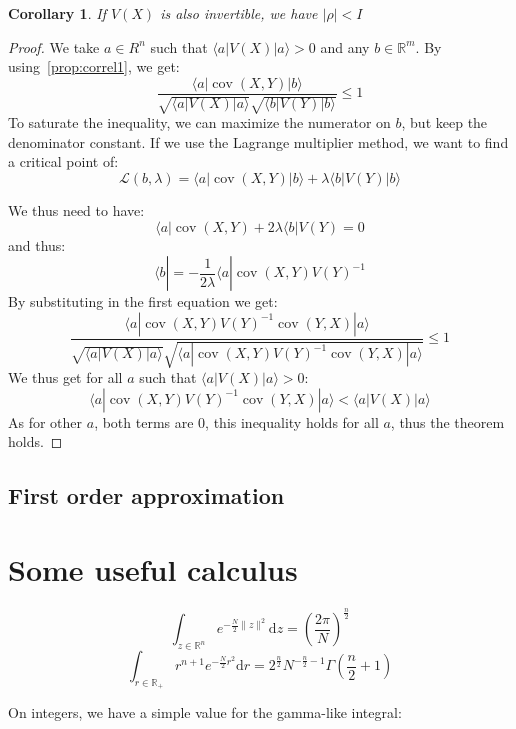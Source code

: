 \documentclass[10pt]{report}
\theoremstyle{plain}
\newtheorem{cor}{Corollary}[thm]
\theoremstyle{definition}
\theoremstyle{remark}
\newcommand{\R}{\ensuremath{\mathbb{R}}}
\newcommand{\ket}[1]{|#1\rangle}
\newcommand{\bra}[1]{\langle#1|}
\newcommand{\dd}{\mathrm{d}}
\renewcommand{\leq}{\leqslant}
\DeclareMathOperator{\cov}{cov}
\begin{document}
\begin{cor}
  If $V(X)$ is also invertible, we have $|\rho| < I$
\end{cor}

\begin{proof}
  We take $a \in R^n$ such that $\bra a V(X) \ket a > 0$ and any $b \in \R^m$.
  By using~\cref{prop:correl1}, we get:
  \[ \frac{ \bra a \cov(X,Y) \ket b}{\sqrt{\bra a V(X) \ket a}\sqrt{\bra b V(Y)
        \ket b}} \leq 1\]
  To saturate the inequality, we can maximize the numerator on $b$, but keep the
  denominator constant. If we use the Lagrange multiplier method, we want to
  find a critical point of:
  \[\mathcal{L}(b,\lambda) = \bra a \cov(X,Y) \ket b + \lambda \bra b V(Y) \ket
    b\]

  We thus need to have:
  \[ \bra a \cov(X,Y) + 2\lambda\bra b V(Y) = 0\]
  and thus:
  \[ \bra b = - \frac 1 {2\lambda} \bra a \cov(X,Y) {V(Y)}^{-1}\]
  By substituting in the first equation we get:
  \[ \frac{ \bra a \cov(X,Y) {V(Y)}^{-1} \cov(Y,X) \ket a}
    {\sqrt{\bra a V(X) \ket a}
      \sqrt{\bra a \cov(X,Y) {V(Y)}^{-1} \cov(Y,X) \ket a}} \leq 1\]
  We thus get for all $a$ such that $\bra a V(X) \ket a > 0$:
  \[ \bra a \cov(X,Y) {V(Y)}^{-1} \cov(Y,X) \ket a < \bra a V(X) \ket a\]
  As for other $a$, both terms are 0, this inequality holds for all $a$, thus
  the theorem holds.
\end{proof}



\section{First order approximation}

\chapter{Some useful calculus}


\begin{equation}\label{eqn:gaussdimn}
  \int_{z \in\R^n} e^{-\frac N2 \|z\|^2} \dd z = {\left(\frac
      {2\pi}{N}\right)}^{\frac n 2}
\end{equation}
\begin{equation}\label{eqn:gausspown}
  \int_{r \in\R_+} r^{n+1} e^{-\frac N2 r^2} \dd r = 2^{\frac n2}N^{-\frac n2
    -1}\Gamma\left(\frac n 2 + 1\right)
\end{equation}

On integers, we have a simple value for the gamma-like integral:
\end{document}
